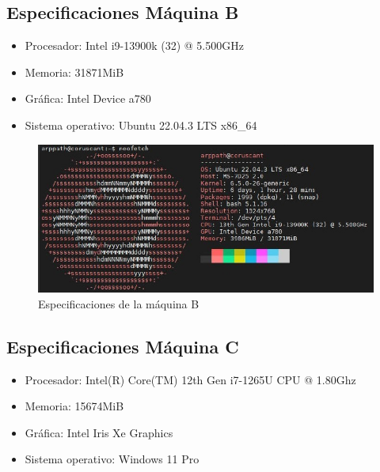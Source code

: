 \subsection{Especificaciones Máquina B}
 \label{maquina_B}
 \begin{itemize}
     \item Procesador: Intel i9-13900k (32) @ 5.500GHz
     \item Memoria: 31871MiB
     \item Gráfica: Intel Device a780
     \item Sistema operativo: Ubuntu 22.04.3 LTS x86\_64
 \end{itemize}
 \begin{figure}[ht!]
     \centering
     \includegraphics[width=14cm]{img/anexos/i9.jpg}
     \caption{Especificaciones de la máquina B}
     \label{fig:maquinaB}
 \end{figure}

\vspace{3mm}

\subsection{Especificaciones Máquina C}
 \label{maquina_C}
 \begin{itemize}
     \item Procesador: Intel(R) Core(TM) 12th Gen i7-1265U CPU @ 1.80Ghz
     \item Memoria: 15674MiB
     \item Gráfica: Intel Iris Xe Graphics
     \item Sistema operativo: Windows 11 Pro
 \end{itemize}

